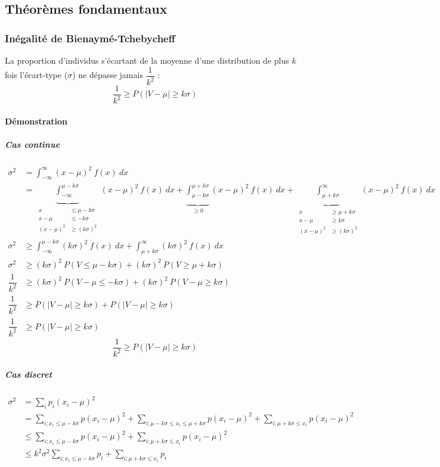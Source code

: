 \newpage
\subsection{Théorèmes fondamentaux}






\subsubsection{Inégalité de Bienaymé-Tchebycheff}
La proportion d'individus s'écartant de la moyenne d'une distribution de plus $k$ fois l'écart-type ($\sigma$) ne dépasse jamais $\dfrac{1}{k^2}$ :
$$\boxed{\dfrac{1}{k^2} \geq P(|V-\mu|\geq k\sigma)}$$
\paragraph{Démonstration}
\subparagraph{Cas continue}
\begin{align*}
	\sigma^2 &= \int_{-\infty}^{\infty} (x-\mu)^2\ f(x)\ dx\\
             &= \underbrace{\int_{-\infty}^{\mu-k\sigma}}_{\begin{aligned}x&\leq\mu-k\sigma\\x-\mu&\leq -k\sigma\\(x-\mu)^2&\geq(k\sigma)^2\end{aligned}} (x-\mu)^2\ f(x)\ dx + \underbrace{\int_{\mu-k\sigma}^{\mu+k\sigma}}_{\geq0} (x-\mu)^2\ f(x)\ dx + \underbrace{\int_{\mu+k\sigma}^{\infty}}_{\begin{aligned}x&\geq\mu+k\sigma\\x-\mu&\geq k\sigma\\(x-\mu)^2&\geq(k\sigma)^2\end{aligned}} (x-\mu)^2\ f(x)\ dx\\
    \sigma^2 &\geq \int_{-\infty}^{\mu-k\sigma} (k\sigma)^2\ f(x)\ dx + \int_{\mu+k\sigma}^{\infty} (k\sigma)^2\ f(x)\ dx\\
    \sigma^2 &\geq (k\sigma)^2\ P(V\leq\mu-k\sigma) + (k\sigma)^2\ P(V\geq\mu+k\sigma)\\
    \dfrac{1}{k^2} &\geq (k\sigma)^2\ P(V-\mu\leq-k\sigma) + (k\sigma)^2\ P(V-\mu\geq k\sigma)\\
    \dfrac{1}{k^2} &\geq P(|V-\mu|\geq k\sigma) + P(|V-\mu|\geq k\sigma)\\
    \dfrac{1}{k^2} &\geq P(|V-\mu|\geq k\sigma)
\end{align*}
$$\boxed{\dfrac{1}{k^2} \geq P(|V-\mu|\geq k\sigma)}$$
\subparagraph{Cas discret}
\begin{align*}
	\sigma^2 &= \sum_{i} p_i(x_i - \mu)^2\\
    &= \sum_{i;x_i\leq\mu-k\sigma} p(x_i - \mu)^2 + \sum_{i;\mu-k\sigma\leq x_i\leq\mu+k\sigma} p(x_i - \mu)^2 + \sum_{i;\mu+k\sigma\leq x_i} p(x_i - \mu)^2\\
    &\leq\sum_{i;x_i\leq\mu-k\sigma} p(x_i - \mu)^2 + \sum_{i;\mu+k\sigma\leq x_i} p(x_i - \mu)^2\\
    &\leq k^2\sigma^2 \sum_{i;x_i\leq\mu-k\sigma} p_i + \sum_{i;\mu+k\sigma\leq x_i} p_i\\
\end{align*}




